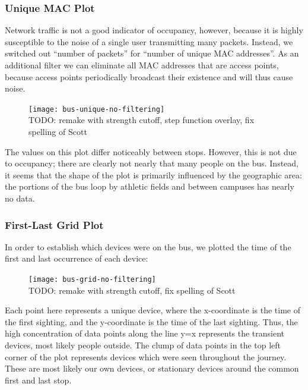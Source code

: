 \documentclass[letterpaper,abstract=on,titlepage=false]{scrreprt}
\begin{document}
	\subsubsection*{Unique MAC Plot}

		Network traffic is not a good indicator of occupancy, however, because it is highly susceptible to the noise of a single user transmitting many packets.
		Instead, we switched out ``number of packets'' for ``number of unique MAC addresses''.
		As an additional filter we can eliminate all MAC addresses that are access points, because access points periodically broadcast their existence and will thus cause noise.

		\begin{figure}[H]
		\texttt{[image: bus-unique-no-filtering]}
		\\TODO: remake with strength cutoff, step function overlay, fix spelling of Scott
		\centering
		\end{figure}

		The values on this plot differ noticeably between stops.
		However, this is not due to occupancy; there are clearly not nearly that many people on the bus.
		Instead, it seems that the shape of the plot is primarily influenced by the geographic area: the portions of the bus loop by athletic fields and between campuses has nearly no data.

	\subsubsection*{First-Last Grid Plot}
		In order to establish which devices were on the bus, we plotted the time of the first and last occurrence of each device:

		\begin{figure}[H]
		\texttt{[image: bus-grid-no-filtering]}
		\\TODO: remake with strength cutoff, fix spelling of Scott
		\centering
		\end{figure}

		Each point here represents a unique device, where the x-coordinate is the time of the first sighting, and the y-coordinate is the time of the last sighting.
		Thus, the high concentration of data points along the line y=x represents the transient devices, most likely people outside.
		The clump of data points in the top left corner of the plot represents devices which were seen throughout the journey.
		These are most likely our own devices, or stationary devices around the common first and last stop.
\end{document}
